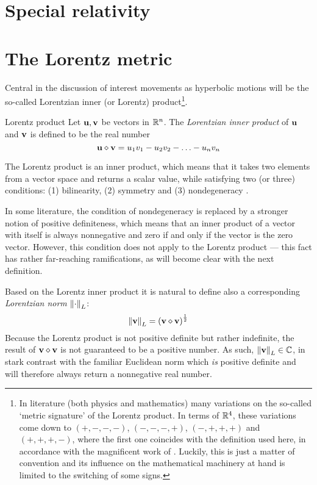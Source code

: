 \section{Special relativity}

\section{The Lorentz metric}
\label{sec:lorentz_metric}
Central in the discussion of interest movements as hyperbolic motions will be the so-called Lorentzian inner (or Lorentz) product\footnote{In literature (both physics and mathematics) many variations on the so-called `metric signature' of the Lorentz product. In terms of $\mathbb{R}^4$, these variations come down to $(+,-,-,-)$, $(-,-,-,+)$, $(-,+,+,+)$ and $(+,+,+,-)$, where the first one coincides with the definition used here, in accordance with the magnificent work of \citet{Landau1971}. Luckily, this is just a matter of convention and its influence on the mathematical machinery at hand is limited to the switching of some signs.}.
\begin{block}{Lorentz product}
    Let $\vb{u}, \vb{v}$ be vectors in $\mathbb{R}^n$. The \emph{Lorentzian inner product} of $\vb{u}$ and $\vb{v}$ is defined to be the real number
    $$ \vb{u} \diamond \vb{v} = u_1v_1 - u_2v_2 - \ldots - u_nv_n   $$
\end{block}
The Lorentz product is an inner product, which means that it takes two elements from a vector space and returns a scalar value, while satisfying two (or three) conditions: (1) bilinearity, (2) symmetry and (3) nondegeneracy \cite{Ratcliffe2019}.

In some literature, the condition of nondegeneracy is replaced by a stronger notion of positive definiteness, which means that an inner product of a vector with itself is always nonnegative and zero if and only if the vector is the zero vector. However, this condition does not apply to the Lorentz product --- this fact has rather far-reaching ramifications, as will become clear with the next definition. 

Based on the Lorentz inner product it is natural to define also a corresponding \emph{Lorentzian norm} $\norm{\cdot}_L$:
    $$ \norm{\vb{v}}_L = \qty(\vb{v}\diamond\vb{v})^\frac{1}{2} $$
Because the Lorentz product is not positive definite but rather indefinite, the result of $\vb{v}\diamond\vb{v}$ is not guaranteed to be a positive number. As such, $\norm{\vb{v}}_L \in \mathbb{C}$, in stark contrast with the familiar Euclidean norm which \emph{is} positive definite and will therefore always return a nonnegative real number.

